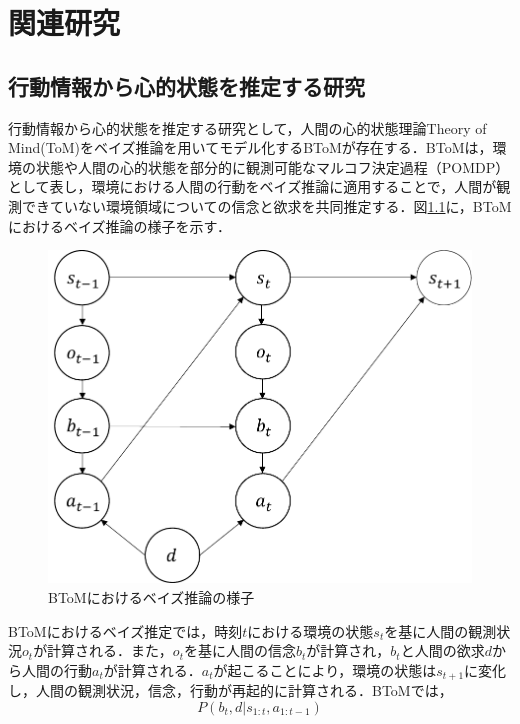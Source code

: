 \chapter{関連研究}
\section{行動情報から心的状態を推定する研究}
\par
行動情報から心的状態を推定する研究として，人間の心的状態理論Theory of Mind(ToM)をベイズ推論を用いてモデル化するBToM\cite{baker2011bayesian}が存在する．BToMは，環境の状態や人間の心的状態を部分的に観測可能なマルコフ決定過程（POMDP）として表し，環境における人間の行動をベイズ推論に適用することで，人間が観測できていない環境領域についての信念と欲求を共同推定する．図\ref{fig:btom}に，BToMにおけるベイズ推論の様子を示す．
\begin{figure}[htbp]
  \begin{center}
    \includegraphics[scale=0.85]{./btom.pdf}
    \caption{BToMにおけるベイズ推論の様子}
    \label{fig:btom}
  \end{center}
\end{figure}
BToMにおけるベイズ推定では，時刻$t$における環境の状態$s_{t}$を基に人間の観測状況$o_{t}$が計算される．また，$o_{t}$を基に人間の信念$b_{t}$が計算され，$b_{t}$と人間の欲求$d$から人間の行動$a_{t}$が計算される．$a_{t}$が起こることにより，環境の状態は$s_{t+1}$に変化し，人間の観測状況，信念，行動が再起的に計算される．BToMでは，
\begin{equation}
  \label{btom1}
  P(b_t,d|s_{1:t},a_{1:t-1})
\end{equation}
